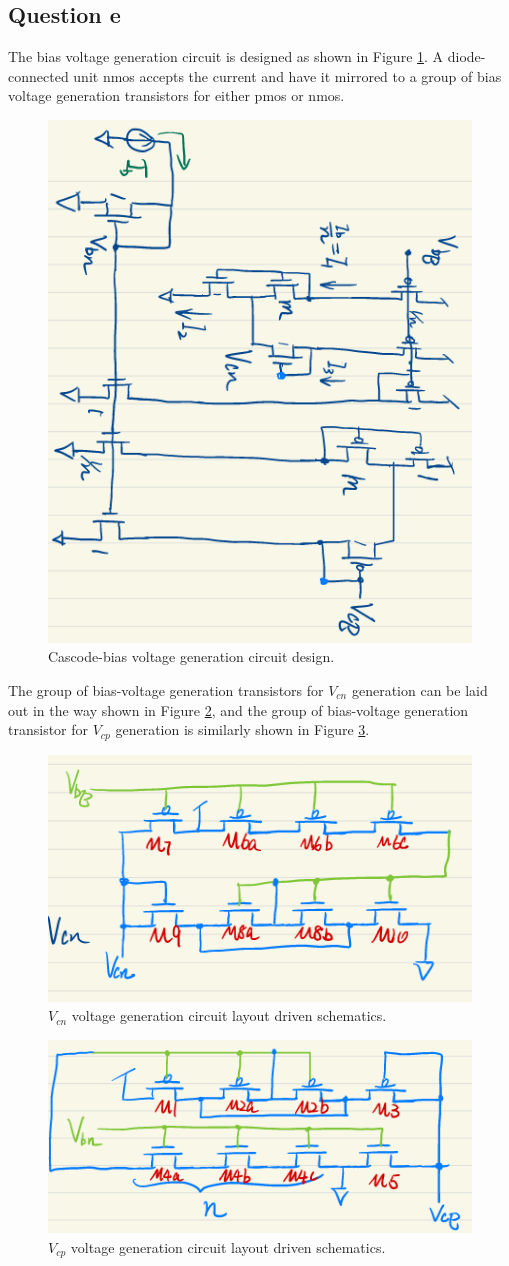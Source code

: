 \documentclass[11pt]{article}
\begin{document}
    \subsection{Question e}
    The bias voltage generation circuit is designed as shown in Figure \ref{fig:biasgen}. A diode-connected unit nmos accepts the current and have it mirrored to a group of bias voltage generation transistors for either pmos or nmos.
    \begin{figure}[!ht]
        \centering
        \includegraphics[width=.5\linewidth, angle=90]{../img/biasgen.png}
        \caption{Cascode-bias voltage generation circuit design.}
        \label{fig:biasgen}
    \end{figure}
    The group of bias-voltage generation transistors for $V_{cn}$ generation can be laid out in the way shown in Figure \ref{fig:cn_design}, and the group of bias-voltage generation transistor for $V_{cp}$ generation is similarly shown in Figure \ref{fig:cp_design}.
    \begin{figure}[!ht]
        \centering
        \includegraphics[width=.5\linewidth]{../img/cn_design.png}
        \caption{$V_{cn}$ voltage generation circuit layout driven schematics.}
        \label{fig:cn_design}
    \end{figure}
    \begin{figure}[!ht]
        \centering
        \includegraphics[width=.5\linewidth]{../img/cp_design.png}
        \caption{$V_{cp}$ voltage generation circuit layout driven schematics.}
        \label{fig:cp_design}
    \end{figure}
\end{document}

